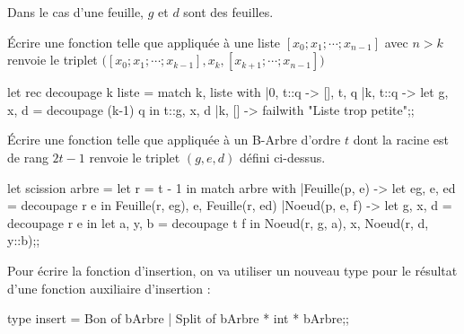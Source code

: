 Dans le cas d'une feuille, $g$ et $d$ sont des feuilles.
\begin{question}{}{}
Écrire une fonction  telle que  appliquée à une liste $[x_0;x_1;\cdots;x_{n-1}]$ avec $n> k$ renvoie le triplet
$\bigl([x_0;x_1;\cdots;x_{k-1}], x_k, [x_{k+1};\cdots;x_{n-1}]\bigr)$
\reponse
\begin{ocaml}
let rec decoupage k liste =
   match k, liste with
   |0, t::q -> [], t, q
   |k, t::q -> let g, x, d = decoupage (k-1) q in t::g, x, d
   |k, [] -> failwith "Liste trop petite";;
\end{ocaml}
\end{question}
\begin{question}{}{}
Écrire une fonction 
telle que  appliquée à un B-Arbre d’ordre $t$ dont la racine est de rang $2t-1$  renvoie le triplet $(g, e, d)$ défini ci-dessus.
\reponse
\begin{ocaml}
let scission arbre =
   let r = t - 1 in
   match arbre with
   |Feuille(p, e) -> let eg, e, ed = decoupage r e in
                     Feuille(r, eg), e, Feuille(r, ed)
   |Noeud(p, e, f) -> let g, x, d = decoupage r e in
                      let a, y, b = decoupage t f in
                      Noeud(r, g, a), x, Noeud(r, d, y::b);;
\end{ocaml}
\end{question}
Pour écrire la fonction d'insertion, on va utiliser un nouveau type pour le résultat d'une fonction auxiliaire d'insertion :
\begin{ocaml}
type insert = Bon of bArbre | Split of bArbre * int * bArbre;;
\end{ocaml}
